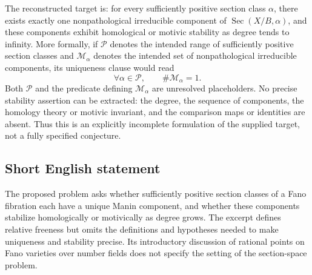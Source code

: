 \documentclass[11pt]{article}
\begin{document}
The reconstructed target is: for every sufficiently positive section class \(\alpha\), there exists exactly one nonpathological irreducible component of \(\operatorname{Sec}(X/B,\alpha)\), and these components exhibit homological or motivic stability as degree tends to infinity. More formally, if \(\mathcal P\) denotes the intended range of sufficiently positive section classes and \(\mathcal M_\alpha\) denotes the intended set of nonpathological irreducible components, its uniqueness clause would read
\[
\forall\alpha\in\mathcal P,\qquad \#\mathcal M_\alpha=1.
\]
Both \(\mathcal P\) and the predicate defining \(\mathcal M_\alpha\) are unresolved placeholders. No precise stability assertion can be extracted: the degree, the sequence of components, the homology theory or motivic invariant, and the comparison maps or identities are absent. Thus this is an explicitly incomplete formulation of the supplied target, not a fully specified conjecture.
\subsection{Short English statement}
The proposed problem asks whether sufficiently positive section classes of a Fano fibration each have a unique Manin component, and whether these components stabilize homologically or motivically as degree grows. The excerpt defines relative freeness but omits the definitions and hypotheses needed to make uniqueness and stability precise. Its introductory discussion of rational points on Fano varieties over number fields does not specify the setting of the section-space problem.
\end{document}
